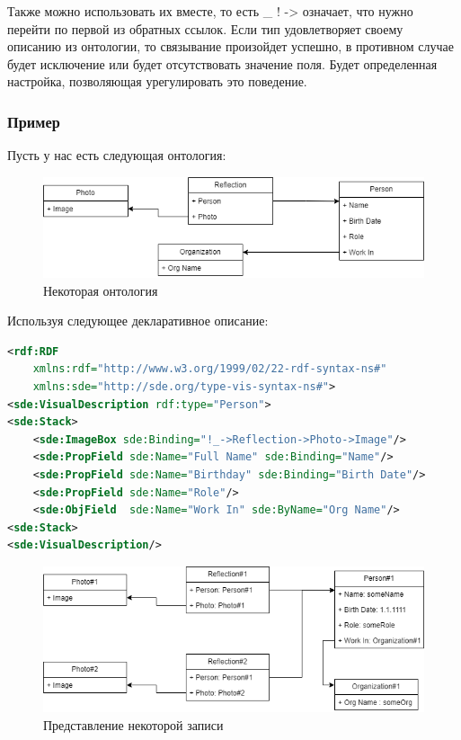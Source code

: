 \documentclass[12pt]{article}
\begin{document}
Также можно использовать их вместе, то есть \_ ! -> означает, что нужно перейти по первой из обратных ссылок.
Если тип удовлетворяет своему описанию из онтологии, то связывание произойдет успешно, в противном случае будет исключение или будет отсутствовать значение поля. Будет определенная настройка, позволяющая урегулировать это поведение.

\subsubsection{Пример}

Пусть у нас есть следующая онтология:

\begin{figure}[!ht]
    \centering
    \includegraphics[width=1\textwidth]{_images/working_ontology.png}
    \caption*{Некоторая онтология}
\end{figure}

Используя следующее декларативное описание:

\begin{lstlisting}[language=XML]
<rdf:RDF
    xmlns:rdf="http://www.w3.org/1999/02/22-rdf-syntax-ns#"
    xmlns:sde="http://sde.org/type-vis-syntax-ns#">
<sde:VisualDescription rdf:type="Person">
<sde:Stack>
    <sde:ImageBox sde:Binding="!_->Reflection->Photo->Image"/>
    <sde:PropField sde:Name="Full Name" sde:Binding="Name"/>
    <sde:PropField sde:Name="Birthday" sde:Binding="Birth Date"/>
    <sde:PropField sde:Name="Role"/>
    <sde:ObjField  sde:Name="Work In" sde:ByName="Org Name"/>
<sde:Stack>
<sde:VisualDescription/>
\end{lstlisting}

\begin{figure}[!ht]
    \centering
    \includegraphics[width=1\textwidth]{_images/working_rdf.png}
    \caption*{Представление некоторой записи}
\end{figure}
\end{document}
